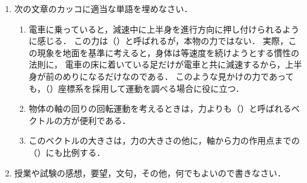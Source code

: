 \documentclass[a4paper,11pt]{ltjsarticle}
\begin{document}
\begin{enumerate}[label={\LARGE \Roman*}]
\clearpage

    \item 次の文章のカッコに適当な単語を埋めなさい．
    

    \begin{enumerate}[label=(\arabic*)]
        \item 電車に乗っていると，減速中に上半身を進行方向に押し付けられるように感じる．
        この力は（）と呼ばれるが，本物の力ではない．
        実際，この現象を地面を基準に考えると，身体は等速度を続けようとする慣性の法則に，
        電車の床に着いている足だけが電車と共に減速するから，上半身が前のめりになるだけなのである．
        このような見かけの力であっても，（）座標系を採用して運動を調べる場合に役に立つ．

        \item 物体の軸の回りの回転運動を考えるときは，力よりも（）と呼ばれるベクトルの方が便利である．
        \item このベクトルの大きさは，力の大きさの他に，軸から力の作用点までの（）にも比例する．
    \end{enumerate}


    \item 授業や試験の感想，要望，文句，その他，何でもよいので書きなさい．

\end{enumerate}
\end{document}
